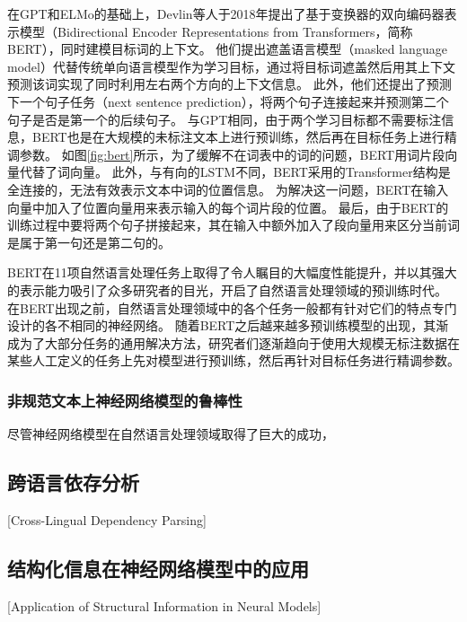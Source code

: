 在GPT和ELMo的基础上，Devlin等人于2018年提出了基于变换器的双向编码器表示模型（Bidirectional Encoder Representations from Transformers，简称BERT）\cite{devlin-etal-2018-bert}，同时建模目标词的上下文。
他们提出遮盖语言模型（masked language model）代替传统单向语言模型作为学习目标，通过将目标词遮盖然后用其上下文预测该词实现了同时利用左右两个方向的上下文信息。
此外，他们还提出了预测下一个句子任务（next sentence prediction），将两个句子连接起来并预测第二个句子是否是第一个的后续句子。
与GPT相同，由于两个学习目标都不需要标注信息，BERT也是在大规模的未标注文本上进行预训练，然后再在目标任务上进行精调参数。
如图\ref{fig:bert}所示，为了缓解不在词表中的词的问题，BERT用词片段向量代替了词向量。
此外，与有向的LSTM不同，BERT采用的Transformer结构是全连接的，无法有效表示文本中词的位置信息。
为解决这一问题，BERT在输入向量中加入了位置向量用来表示输入的每个词片段的位置。
最后，由于BERT的训练过程中要将两个句子拼接起来，其在输入中额外加入了段向量用来区分当前词是属于第一句还是第二句的。

BERT在11项自然语言处理任务上取得了令人瞩目的大幅度性能提升，并以其强大的表示能力吸引了众多研究者的目光，开启了自然语言处理领域的预训练时代。
在BERT出现之前，自然语言处理领域中的各个任务一般都有针对它们的特点专门设计的各不相同的神经网络。
随着BERT之后越来越多预训练模型的出现，其渐成为了大部分任务的通用解决方法，研究者们逐渐趋向于使用大规模无标注数据在某些人工定义的任务上先对模型进行预训练，然后再针对目标任务进行精调参数。

\subsubsection{非规范文本上神经网络模型的鲁棒性}

尽管神经网络模型在自然语言处理领域取得了巨大的成功，

\subsection{跨语言依存分析}[Cross-Lingual Dependency Parsing]





\subsection{结构化信息在神经网络模型中的应用}[Application of Structural Information in Neural Models]

